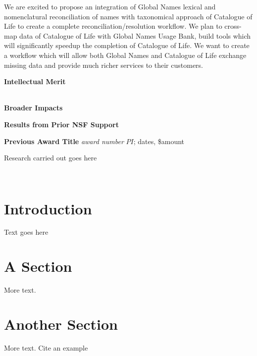 \documentclass{proposal}
\begin{document}
We are excited to propose an integration of Global Names lexical and
nomenclatural reconciliation of names with taxonomical approach of Catalogue of
Life to create a complete reconciliation/resolution workflow. We plan to
cross-map data of Catalogue of Life with Global Names Usage Bank,
build tools which will significantly speedup the completion of Catalogue of
Life. We want to create a workflow which will allow both Global Names and
Catalogue of Life exchange missing data and provide much richer services to
their customers.

\noindent
{\bf Intellectual Merit}

\ \\

\noindent
{\bf Broader Impacts}

\renewcommand{\thepage} {B--\arabic{page}}

\newpage


\renewcommand{\thepage} {D--\arabic{page}}

\newpage

\centerline{\bf Results from Prior NSF Support}

\noindent
{\bf Previous Award Title}
\textit{award number} \(PI\); dates, \$amount

Research carried out goes here

\ \\


\section{Introduction}

Text goes here

\section{A Section}

More text.

\section{Another Section}

More text.  Cite an example~\cite[]{Patterson2016}
\end{document}

